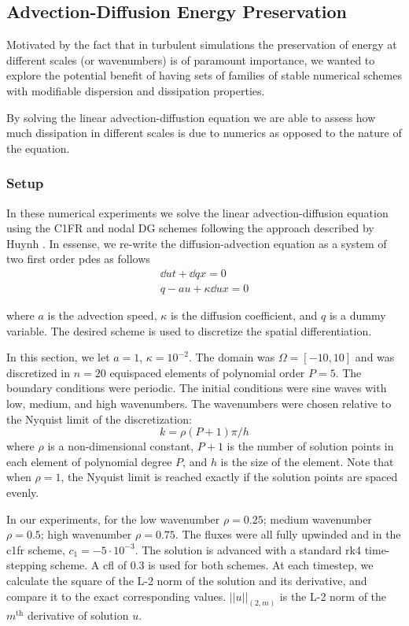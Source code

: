 \subsection{Advection-Diffusion Energy Preservation}
\label{sec:advDiff}
Motivated by the fact that in turbulent simulations the preservation of energy at different scales (or wavenumbers) is of paramount importance, we wanted to explore the potential benefit of having sets of families of stable numerical schemes with modifiable dispersion and dissipation properties.

By solving the linear advection-diffustion equation we are able to assess how much dissipation in different scales is due to numerics as opposed to the nature of the equation.

\subsubsection{Setup}

In these numerical experiments we solve the linear advection-diffusion equation using the C1FR and nodal DG schemes following the approach described by Huynh \cite{huynh2009reconstruction}. In essense, we re-write the diffusion-advection equation as a system of two first order \gls{pde}s as follows
\begin{equation}
\begin{split}
\dd{u}{t} + \dd{q}{x} = 0 \\
q - au + \kappa\dd{u}{x} = 0
\end{split}
\end{equation}

where $a$ is the advection speed, $\kappa$ is the diffusion coefficient, and $q$ is a dummy variable. The desired scheme is used to discretize the spatial differentiation.

In this section, we let $a = 1$, $\kappa = 10^{-2}$. The domain was $\Omega = [-10,10]$ and was discretized in $n = 20$ equispaced elements of polynomial order $P = 5$. The boundary conditions were periodic. The initial conditions were sine waves with low, medium, and high wavenumbers. The wavenumbers were chosen relative to the Nyquist limit of the discretization: 
\[k = \rho (P+1)\pi/h\]
 where $\rho$ is a non-dimensional constant, $P+1$ is the number of solution points in each element of polynomial degree $P$, and $h$ is the size of the element. Note that when $\rho = 1$, the Nyquist limit is reached exactly if the solution points are spaced evenly.

In our experiments, for the low wavenumber $\rho = 0.25$; medium wavenumber $\rho = 0.5$; high wavenumber $\rho = 0.75$. The fluxes were all fully upwinded and in the \gls{c1fr} scheme, $c_1 = -5\cdot10^{-3}$. The solution is advanced with a standard \gls{rk}4 time-stepping scheme. A \gls{cfl} of $0.3$ is used for both schemes. At each timestep, we calculate the square of the L-2 norm of the solution and its derivative, and compare it to the exact corresponding values. $||u||_{(2,m)} $ is the L-2 norm of the $m^{\text{th}}$ derivative of solution $u$.


